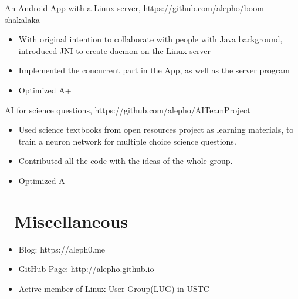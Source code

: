 \documentclass{resume}
\begin{document}
An Android App with a Linux server, https://github.com/alepho/boom-shakalaka
\begin{itemize}
  \item With original intention to collaborate with people with Java background, introduced JNI to create daemon on the Linux server
  \item Implemented the concurrent part in the App, as well as the server program
  \item Optimized A+
\end{itemize}

AI for science questions, https://github.com/alepho/AITeamProject
\begin{itemize}
  \item Used science textbooks from open resources project as learning materials, to train a neuron network for multiple choice science questions.
  \item Contributed all the code with the ideas of the whole group.
  \item Optimized A
\end{itemize}



\section{\faInfo\ Miscellaneous}
\begin{itemize}[parsep=0.5ex]
  \item Blog: https://aleph0.me
  \item GitHub Page: http://alepho.github.io
  \item Active member of Linux User Group(LUG) in USTC
\end{itemize}

%
%
\end{document}
